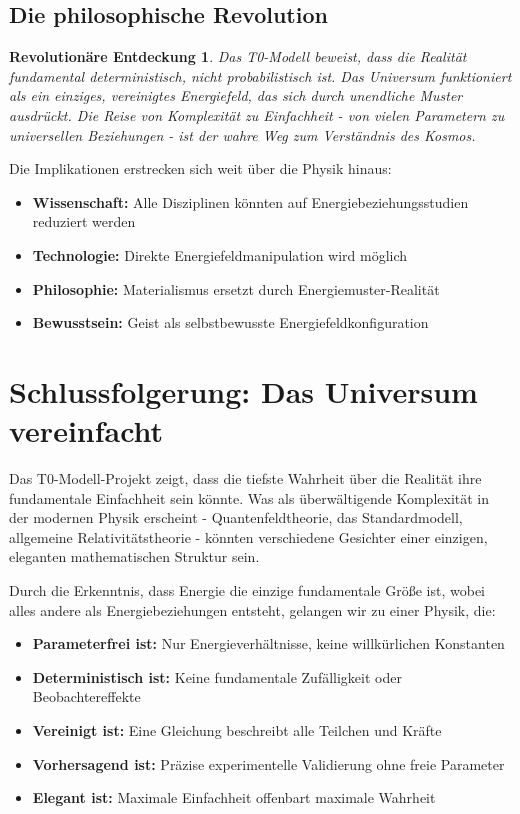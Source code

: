 \documentclass[12pt,a4paper]{report}
\newtheorem{discovery}{Revolutionäre Entdeckung}[chapter]
\begin{document}
	\section{Die philosophische Revolution}
	
	\begin{discovery}
		Das T0-Modell beweist, dass die Realität fundamental deterministisch, nicht probabilistisch ist. Das Universum funktioniert als ein einziges, vereinigtes Energiefeld, das sich durch unendliche Muster ausdrückt. Die Reise von Komplexität zu Einfachheit - von vielen Parametern zu universellen Beziehungen - ist der wahre Weg zum Verständnis des Kosmos.
	\end{discovery}
	
	Die Implikationen erstrecken sich weit über die Physik hinaus:
	\begin{itemize}
		\item \textbf{Wissenschaft:} Alle Disziplinen könnten auf Energiebeziehungsstudien reduziert werden
		\item \textbf{Technologie:} Direkte Energiefeldmanipulation wird möglich
		\item \textbf{Philosophie:} Materialismus ersetzt durch Energiemuster-Realität
		\item \textbf{Bewusstsein:} Geist als selbstbewusste Energiefeldkonfiguration
	\end{itemize}
	
	\chapter{Schlussfolgerung: Das Universum vereinfacht}
	
	Das T0-Modell-Projekt zeigt, dass die tiefste Wahrheit über die Realität ihre fundamentale Einfachheit sein könnte. Was als überwältigende Komplexität in der modernen Physik erscheint - Quantenfeldtheorie, das Standardmodell, allgemeine Relativitätstheorie - könnten verschiedene Gesichter einer einzigen, eleganten mathematischen Struktur sein.
	
	Durch die Erkenntnis, dass Energie die einzige fundamentale Größe ist, wobei alles andere als Energiebeziehungen entsteht, gelangen wir zu einer Physik, die:
	
	\begin{itemize}
		\item \textbf{Parameterfrei ist:} Nur Energieverhältnisse, keine willkürlichen Konstanten
		\item \textbf{Deterministisch ist:} Keine fundamentale Zufälligkeit oder Beobachtereffekte
		\item \textbf{Vereinigt ist:} Eine Gleichung beschreibt alle Teilchen und Kräfte
		\item \textbf{Vorhersagend ist:} Präzise experimentelle Validierung ohne freie Parameter
		\item \textbf{Elegant ist:} Maximale Einfachheit offenbart maximale Wahrheit
	\end{itemize}
	
\end{document}
